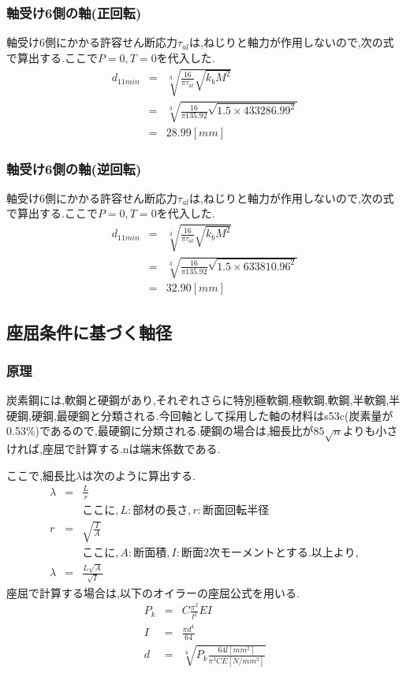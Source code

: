 \documentclass[a4j,twoside,openright,11pt]{jreport}
\begin{document}
\subsubsection{軸受け6側の軸(正回転)}
軸受け6側にかかる許容せん断応力$\tau_{al}$は,ねじりと軸力が作用しないので,次の式で算出する.ここで$P=0,T=0$を代入した.
\begin{eqnarray}
d_{11min} &=& \sqrt [3]{ \frac{16}{\pi \tau_{al}}\sqrt{k_bM^2} }\\
       &=& \sqrt [3]{ \frac{16}{\pi 135.92}\sqrt{1.5 \times 433286.99^2} }\\
       &=& 28.99[mm]
\end{eqnarray}
\subsubsection{軸受け6側の軸(逆回転)}
軸受け6側にかかる許容せん断応力$\tau_{al}$は,ねじりと軸力が作用しないので,次の式で算出する.ここで$P=0,T=0$を代入した.
\begin{eqnarray}
d_{11min} &=& \sqrt [3]{ \frac{16}{\pi \tau_{al}}\sqrt{k_bM^2} }\\
       &=& \sqrt [3]{ \frac{16}{\pi 135.92}\sqrt{1.5 \times 633810.96^2} }\\
       &=& 32.90[mm]
\end{eqnarray}

\subsection{座屈条件に基づく軸径}
\subsubsection{原理}
炭素鋼には,軟鋼と硬鋼があり,それぞれさらに特別極軟鋼,極軟鋼,軟鋼,半軟鋼,半硬鋼,硬鋼,最硬鋼と分類される.今回軸として採用した軸の材料はs53c(炭素量が0.53\%)であるので,最硬鋼に分類される.硬鋼の場合は,細長比が$85 \sqrt n$よりも小さければ,座屈で計算する.nは端末係数である.\\
\par
ここで,細長比$\lambda$は次のように算出する.
\begin{eqnarray}
\lambda &=& \frac{L}{r}\\
&&ここに,L:部材の長さ,r:断面回転半径\\
r&=&\sqrt{\frac{I}{A}}\\
&&ここに,A:断面積,I:断面2次モーメントとする.以上より,\\
\lambda &=& \frac{L\sqrt{A}}{\sqrt{I}}
\end{eqnarray}
座屈で計算する場合は,以下のオイラーの座屈公式を用いる.
\begin{eqnarray}
P_k &=& C\frac{\pi^2}{l^2}EI\\
I&=&\frac{\pi d^4}{64}\\
d&=&\sqrt[4]{P_k\frac{64l[mm^2]}{\pi^3CE[N/mm^2]}}
\end{eqnarray}
\end{document}
